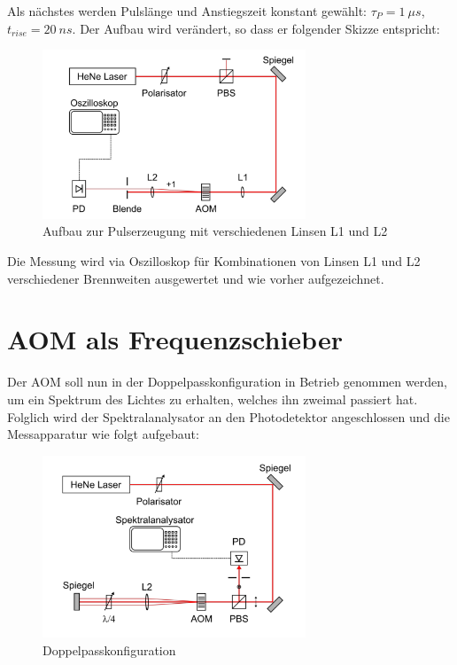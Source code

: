 \documentclass[bigchapter,colorback,accentcolor=tud4b,linedtoc,11pt]{tudreport}
\begin{document}
Als nächstes werden Pulslänge und Anstiegszeit konstant gewählt: $\tau_P = 1~\mu s$, $t_{rise} = 20~ns$. Der Aufbau wird verändert, so dass er folgender Skizze entspricht:  

\begin{figure}[H] 
  \centering
     \includegraphics[width=0.7\textwidth]{data/pulserzeugung.jpg}
  \caption[Cap for listoffigures]{Aufbau zur Pulserzeugung mit verschiedenen Linsen L1 und L2}
  \label{fig:Bild2}
\end{figure}

Die Messung wird via Oszilloskop für Kombinationen von Linsen L1 und L2 verschiedener Brennweiten ausgewertet und wie vorher aufgezeichnet.

\section{AOM als Frequenzschieber}

Der AOM soll nun in der Doppelpasskonfiguration in Betrieb genommen werden, um ein Spektrum des Lichtes zu erhalten, welches ihn zweimal passiert hat. Folglich wird der Spektralanalysator an den Photodetektor angeschlossen und die Messapparatur wie folgt aufgebaut: 

\begin{figure}[H] 
  \centering
     \includegraphics[width=0.7\textwidth]{data/doppelpass.jpg}
  \caption[Cap for listoffigures]{Doppelpasskonfiguration}
  \label{fig:Bild2}
\end{figure}
\end{document}

